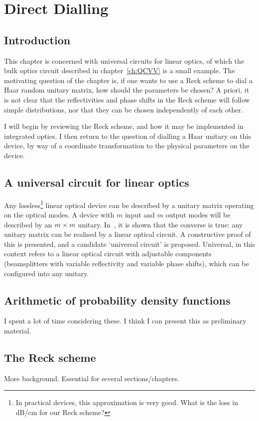 \chapter{Direct Dialling}
\label{ch:DirectDialling}
\section{Introduction}
This chapter is concerned with universal circuits for linear optics, of which
the bulk optics circuit described in chapter~\ref{ch:QCVV} is a small
example.
The motivating question of the chapter is, if one wants to use a Reck
scheme\cite{reck94} to dial a Haar random unitary matrix, how should the
parameters be chosen? A priori, it is not clear that the reflectivities and
phase shifts in the Reck scheme will follow simple distributions, nor that they
can be chosen independently of each other.

I will begin by reviewing the Reck scheme, and how it may be implemented in
integrated optics. I then return to the question of dialling a Haar unitary on
this device, by way of a coordinate transformation to the physical parameters on
the device.

\section{A universal circuit for linear optics}
Any lossless\footnote{In practical devices, this approximation is very good.
What is the loss in dB/cm for our Reck scheme?} linear optical device can be
described by a unitary matrix operating on the optical modes. A device with
\(m\) input and \(m\) output modes will be described by an \(m \times m\) unitary.
In~\cite{reck94}, it is shown that the converse is true: any unitary matrix can
be realised by a linear optical circuit. A constructive proof of this is
presented, and a candidate `universal circuit' is proposed. Universal, in this
context refers to a linear optical circuit with adjustable components
(beamsplitters with variable reflectivity and variable phase shifts), which can
be configured into any unitary.

\section{Arithmetic of probability density functions}
I spent a lot of time considering these. I think I can present this as
preliminary material.

\section{The Reck scheme}
More background. Essential for several sections/chapters.

